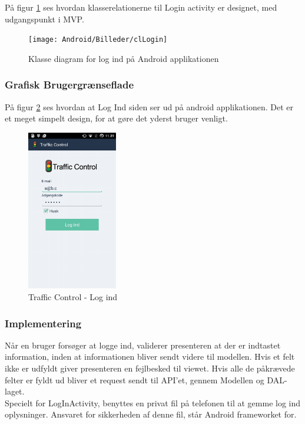 	\clearpage
	
	På figur \ref{fig:Klasse diagram for Log Ind Android} ses hvordan klasserelationerne til Login activity er designet, med udgangspunkt i MVP.
	
	\begin{figure} [!ht]
		\begin{center}
			\texttt{[image: Android/Billeder/clLogin]}
		\end{center}
		\caption{Klasse diagram for log ind på Android applikationen}
		\label{fig:Klasse diagram for Log Ind Android}
	\end{figure}
	
	\clearpage
		
	\subsubsection{Grafisk Brugergrænseflade}
	På figur \ref{fig:Traffic Control - Log ind} ses hvordan at Log Ind siden ser ud på android applikationen.
	Det er et meget simpelt design, for at gøre det yderst bruger venligt.
	
	\begin{figure} [h]
		\begin{center}
			\includegraphics[height=7cm]{Android/Billeder/AndroidLogIn}
		\end{center}
		\caption{Traffic Control - Log ind}
		\label{fig:Traffic Control - Log ind}
	\end{figure}
	
	\subsubsection{Implementering}
	Når en bruger forsøger at logge ind, validerer presenteren at der er indtastet information, inden at informationen bliver sendt videre til modellen. Hvis et felt ikke er udfyldt giver presenteren en fejlbesked til viewet. Hvis alle de påkrævede felter er fyldt ud bliver et request sendt til API'et, gennem Modellen og DAL-laget. 
	\\Specielt for LogInActivity, benyttes en privat fil på telefonen til at gemme log ind oplysninger. Ansvaret for sikkerheden af denne fil, står Android frameworket for.
	
